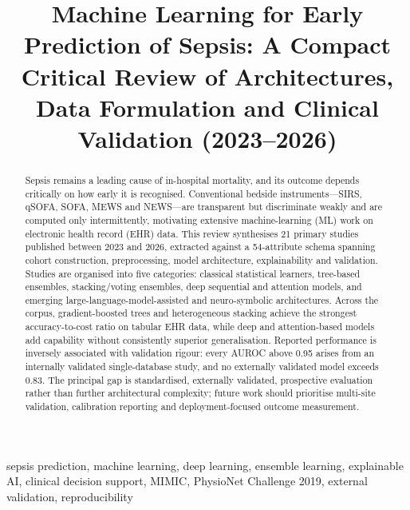 \documentclass[conference]{IEEEtran}
\begin{document}
\title{Machine Learning for Early Prediction of Sepsis: A Compact Critical Review of Architectures, Data Formulation and Clinical Validation (2023--2026)}

\author{
}

\maketitle

\begin{abstract}
Sepsis remains a leading cause of in-hospital mortality, and its outcome depends critically on how early it is recognised. Conventional bedside instruments---SIRS, qSOFA, SOFA, MEWS and NEWS---are transparent but discriminate weakly and are computed only intermittently, motivating extensive machine-learning (ML) work on electronic health record (EHR) data. This review synthesises 21 primary studies published between 2023 and 2026, extracted against a 54-attribute schema spanning cohort construction, preprocessing, model architecture, explainability and validation. Studies are organised into five categories: classical statistical learners, tree-based ensembles, stacking/voting ensembles, deep sequential and attention models, and emerging large-language-model-assisted and neuro-symbolic architectures. Across the corpus, gradient-boosted trees and heterogeneous stacking achieve the strongest accuracy-to-cost ratio on tabular EHR data, while deep and attention-based models add capability without consistently superior generalisation. Reported performance is inversely associated with validation rigour: every AUROC above 0.95 arises from an internally validated single-database study, and no externally validated model exceeds 0.83. The principal gap is standardised, externally validated, prospective evaluation rather than further architectural complexity; future work should prioritise multi-site validation, calibration reporting and deployment-focused outcome measurement.
\end{abstract}

\begin{IEEEkeywords}
sepsis prediction, machine learning, deep learning, ensemble learning, explainable AI, clinical decision support, MIMIC, PhysioNet Challenge 2019, external validation, reproducibility
\end{IEEEkeywords}
\end{document}
